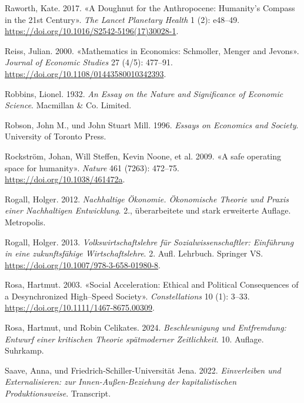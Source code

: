 \documentclass[
  nswissgerman,
  a4paper,
  DIV=11,
  numbers=noendperiod,
  oneside,
  openany]{scrreprt}
\newlength{\cslhangindent}
\newenvironment{CSLReferences}[2] %
 {\begin{list}{}{%
  \setlength{\itemindent}{0pt}
  \setlength{\leftmargin}{0pt}
  \setlength{\parsep}{0pt}
  \ifodd #1
   \setlength{\leftmargin}{\cslhangindent}
   \setlength{\itemindent}{-1\cslhangindent}
  \fi
  \setlength{\itemsep}{#2\baselineskip}}}
 {\end{list}}
\begin{document}
\begin{CSLReferences}{1}{1}
Raworth, Kate. 2017. {«A Doughnut for the Anthropocene: Humanity's
Compass in the 21st Century»}. \emph{The Lancet Planetary Health} 1 (2):
e48--49. \url{https://doi.org/10.1016/S2542-5196(17)30028-1}.

Reiss, Julian. 2000. {«Mathematics in Economics: Schmoller, Menger and
Jevons»}. \emph{Journal of Economic Studies} 27 (4/5): 477--91.
\url{https://doi.org/10.1108/01443580010342393}.

Robbins, Lionel. 1932. \emph{An Essay on the Nature and Significance of
Economic Science}. Macmillan \& Co. Limited.

Robson, John M., und John Stuart Mill. 1996. \emph{Essays on Economics
and Society}. University of Toronto Press.

Rockström, Johan, Will Steffen, Kevin Noone, et al. 2009. {«A safe
operating space for humanity»}. \emph{Nature} 461 (7263): 472--75.
\url{https://doi.org/10.1038/461472a}.

Rogall, Holger. 2012. \emph{Nachhaltige Ökonomie. Ökonomische Theorie
und Praxis einer Nachhaltigen Entwicklung}. 2., überarbeitete und stark
erweiterte Auflage. Metropolis.

Rogall, Holger. 2013. \emph{Volkswirtschaftslehre für
{Sozialwissenschaftler}: {Einführung} in eine zukunftsfähige
{Wirtschaftslehre}}. 2. Aufl. Lehrbuch. Springer VS.
\url{https://doi.org/10.1007/978-3-658-01980-8}.

Rosa, Hartmut. 2003. {«Social Acceleration: Ethical and Political
Consequences of a Desynchronized High--Speed Society»}.
\emph{Constellations} 10 (1): 3--33.
\url{https://doi.org/10.1111/1467-8675.00309}.

Rosa, Hartmut, und Robin Celikates. 2024. \emph{Beschleunigung und
Entfremdung: Entwurf einer kritischen Theorie spätmoderner
Zeitlichkeit}. 10. Auflage. Suhrkamp.

Saave, Anna, und Friedrich-Schiller-Universität Jena. 2022.
\emph{Einverleiben und Externalisieren: zur Innen-Außen-Beziehung der
kapitalistischen Produktionsweise}. Transcript.


\end{CSLReferences}
\end{document}

